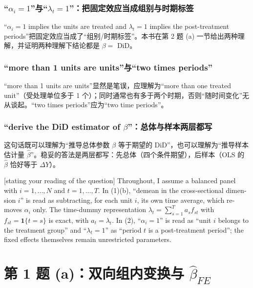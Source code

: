 \subsubsection{“\texorpdfstring{$\alpha_i=1$}{alpha\_i=1}”与“\texorpdfstring{$\lambda_t=1$}{lambda\_t=1}”：把固定效应当成组别与时期标签}
“$\alpha_i=1$ implies the units are treated and $\lambda_t=1$ implies the post-treatment periods”把固定效应当成了“组别/时期标签”。本书在第 2 题 (a) 一节给出两种理解，并证明两种理解下结论都是 $\beta=$ DiD。

\subsubsection{“more than 1 units are units”与“two times periods”}
“more than 1 units are units”显然是笔误，应理解为“more than one treated unit”（受处理单位多于 1 个）；同时通常也有多于两个时期，否则“随时间变化”无从谈起。“two times periods”应为“two time periods”。

\subsubsection{“derive the DiD estimator of \texorpdfstring{$\beta$}{beta}”：总体与样本两层都写}
这句话既可以理解为“推导总体参数 $\beta$ 等于期望的 DiD”，也可以理解为“推导样本估计量 $\hat\beta$”。稳妥的答法是两层都写：先总体（四个条件期望），后样本（OLS 的 $\hat\beta$ 恰好等于 $\Delta Y$）。

\begin{english}[stating your reading of the question]
Throughout, I assume a balanced panel with $i=1,\dots,N$ and $t=1,\dots,T$. In (1)(b), ``demean in the cross-sectional dimension $i$'' is read as subtracting, for each unit $i$, its own time average, which removes $\alpha_i$ only. The time-dummy representation $\lambda_t=\sum_{s=1}^Ta_sf_{st}$ with $f_{st}=\mathbf{1}\{t=s\}$ is exact, with $a_t=\lambda_t$. In (2), ``$\alpha_i=1$'' is read as ``unit $i$ belongs to the treatment group'' and ``$\lambda_t=1$'' as ``period $t$ is a post-treatment period''; the fixed effects themselves remain unrestricted parameters.
\end{english}

\section{第 1 题 (a)：双向组内变换与 \texorpdfstring{$\hat\beta_{FE}$}{beta\_FE}}\label{sec:U17a-q1a}

